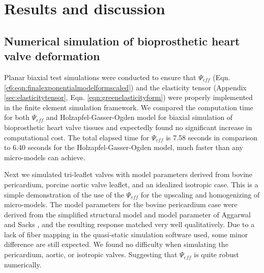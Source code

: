 \section{Results and discussion}



\subsection{Numerical simulation of bioprosthetic heart valve deformation}
	
    Planar biaxial test simulations were conducted to ensure that $\Psi_{eff}$ (Eqn. \ref{c6:eqn:finalexponentialmodelformscaled}) and the elasticity tensor (Appendix \ref{sec:elasticitytensor}, Eqn. \ref{eqn:greenelasticityform}) were properly implemented in the finite element simulation framework.  We compared the computation time for both $\Psi_{eff}$ and Holzapfel-Gasser-Ogden model for biaxial simulation of bioprosthetic heart valve tissues and expectedly found no significant increase in computational cost. The total elapsed time for $\Psi_{eff}$ is 7.58 seconds in comparison to 6.40 seconds for the Holzapfel-Gasser-Ogden model, much faster than any micro-models can achieve.  

	Next we simulated tri-leaflet valves with model parameters derived from bovine pericardium, porcine aortic valve leaflet, and an idealized isotropic case. This is a simple demonstration of the use of the $\Psi_{eff}$ for the upscaling and homogenizing of micro-models. The model parameters for the bovine pericardium case were derived from the simplified structural model and model parameter of Aggarwal and Sacks \cite{aggarwal_inverse_2015}, and the resulting response matched very well qualitatively. Due to a lack of fiber mapping in the quasi-static simulation software used, some minor difference are still expected. We found no difficulty when simulating the pericardium, aortic, or isotropic valves. Suggesting that $\Psi_{eff}$ is quite robust numerically.
	

